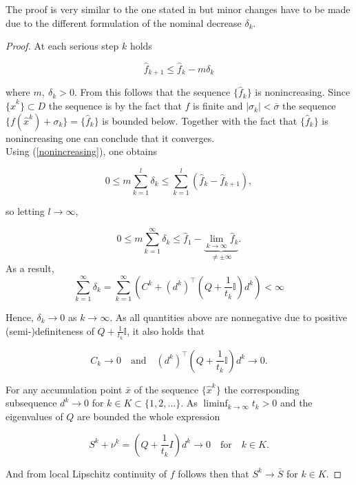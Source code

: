The proof is very similar to the one stated in \cite{Hare2016} but minor changes have to be made due to the different formulation of the nominal decrease \(\delta_k\).

\begin{proof}
	At each serious step \(k\) holds
	
	\begin{equation}
		\hat{f}_{k+1} \leq \hat{f}_k - m\delta_k
	\label{nonincreasing}
	\end{equation}
	
	where \(m, ~\delta_k > 0\). From this follows that the sequence \(\{\hat{f}_k\}\) is nonincreasing.
	Since \(\{\hat{x}^k\} \subset D\) the sequence is by the fact that \(f\) is finite %
	and \(|\sigma_k| < \bar{\sigma}\) the sequence \(\{f(\hat{x}^k)+\sigma_k\} = \{\hat{f}_k\}\) is bounded below. Together with the fact that \(\{\hat{f}_k\}\) is nonincreasing one can conclude that it converges. \\
	Using (\ref{nonincreasing}), one obtains
	
	\begin{equation}
		0 \leq m \sum_{k = 1}^l \delta_k \leq \sum_{k = 1}^l \left(\hat{f}_k-\hat{f}_{k+1}\right),
	\end{equation}
	
	so letting \(l \to \infty\), 
	
	\begin{equation}
		0 \leq m\sum_{k=1}^{\infty} \delta_k \leq \hat{f}_1 - \underbrace{\lim_{k \to \infty} \hat{f}_k}_{\neq \pm \infty}.
	\end{equation}
	As a result,
	\begin{equation}
		\sum_{k = 1}^{\infty} \delta_k = \sum_{k=1}^{\infty}\left(C^k+(d^k)^{\top}\left(Q+\frac{1}{t_k}\mathbb{I}\right)d^k\right) < \infty
	\end{equation}
	
	Hence, \(\delta_k \to 0\) as \(k \to \infty\). As all quantities above are nonnegative due to positive (semi-)definiteness of \(Q+\frac{1}{t_k}\mathbb{I}\), it also holds that
	
	\begin{equation}
		C_k \to 0 \quad \text{and} \quad (d^k)^{\top}\left(Q+\frac{1}{t_k}\mathbb{I}\right)d^k \to 0.
	\end{equation}
	
	For any accumulation point \(\bar{x}\) of the sequence \(\{\hat{x}^k\}\) the corresponding subsequence \(d^k \to 0\) for \(k \in K \subset \{1,2,...\} \). As \(\liminf_{k \to \infty} t_k > 0\) and the eigenvalues of \(Q\) are bounded the whole expression 
	
	\begin{equation}
	 S^k + \nu^k = \left(Q+\frac{1}{t_k}I \right)d^k  \to 0 \quad \text{for} \quad k \in K.
	\end{equation}
	
	And from local Lipschitz continuity of \(f\) follows then that \(S^k \to \bar{S}\) for \(k \in K\).
	
\end{proof}

